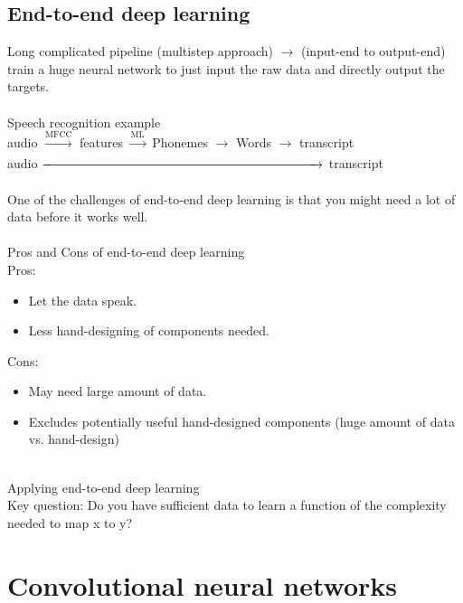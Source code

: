 %
\subsection{End-to-end deep learning}
Long complicated pipeline (multistep approach) $\rightarrow$ (input-end to output-end) train a huge neural network to just input the raw data and directly output the targets.\\
\\
Speech recognition example\\
audio $\xrightarrow[]{\text{MFCC}}$ features $\xrightarrow[]{\text{ML}}$ Phonemes $\rightarrow$ Words $\rightarrow$  transcript
\\
audio $\xrightarrow{\hspace*{7.6cm}}$ transcript\\
\\
One of the challenges of end-to-end deep learning is that you might need a lot of data before it works well.\\
\\
Pros and Cons of end-to-end deep learning\\

Pros:
\begin{itemize}
\item
Let the data speak.
\item
Less hand-designing of components needed.
\end{itemize}

Cons:
\begin{itemize}
\item
May need large amount of data.
\item
Excludes potentially useful hand-designed components (huge amount of data vs. hand-design)
\end{itemize}
~\\
Applying end-to-end deep learning\\
Key question: Do you have sufficient data to learn a function of the complexity needed to map x to y?



\clearpage
\section{Convolutional neural networks}

%
